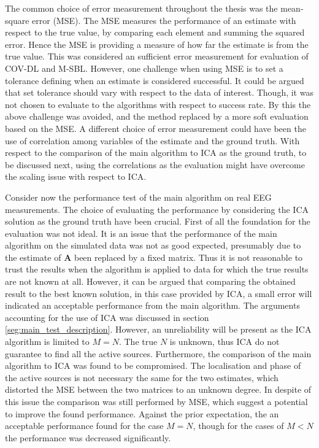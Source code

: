 The common choice of error measurement throughout the thesis was the mean-square error (MSE). The MSE measures the performance of an estimate with respect to the true value, by comparing each element and summing the squared error. Hence the MSE is providing a measure of how far the estimate is from the true value. This was considered an sufficient error measurement for evaluation of COV-DL and M-SBL.
However, one challenge when using MSE is to set a tolerance defining when an estimate is considered successful. It could be argued that set tolerance should vary with respect to the data of interest.
Though, it was not chosen to evaluate to the algorithms with respect to success rate. By this the above challenge was avoided, and the method replaced by a more soft evaluation based on the MSE.  
A different choice of error measurement could have been the use of correlation among variables of the estimate and the ground truth. With respect to the comparison of the main algorithm to ICA as the ground truth, to be discussed next, using the correlations as the evaluation might have overcome the scaling issue with respect to ICA.    

Consider now the performance test of the main algorithm on real EEG measurements. The choice of evaluating the performance by considering the ICA solution as the ground truth have been crucial.   
First of all the foundation for the evaluation was not ideal.  
It is an issue that the performance of the main algorithm on the simulated data was not as good expected, presumably due to the estimate of $\textbf{A}$ been replaced by a fixed matrix. 
Thus it is not reasonable to trust the results when the algorithm is applied to data for which the true results are not known at all. 
However, it can be argued that comparing the obtained result to the best known solution, in this case provided by ICA, a small error will indicated an acceptable performance from the main algorithm. 
The arguments accounting for the use of ICA was discussed in section \ref{seg:main_test_description}. However, an unreliability will be present as the ICA algorithm is limited to $M = N$. The true $N$ is unknown, thus ICA do not guarantee to find all the active sources.
Furthermore, the comparison of the main algorithm to ICA was found to be compromised. The localisation and phase of the active sources is not necessary the same for the two estimates, which distorted the MSE between the two matrices to an unknown degree.
In despite of this issue the comparison was still performed by MSE, which suggest a potential to improve the found performance. Against the prior expectation, the an acceptable performance found for the case $M=N$, though for the cases of $M<N$ the performance was decreased significantly.    

